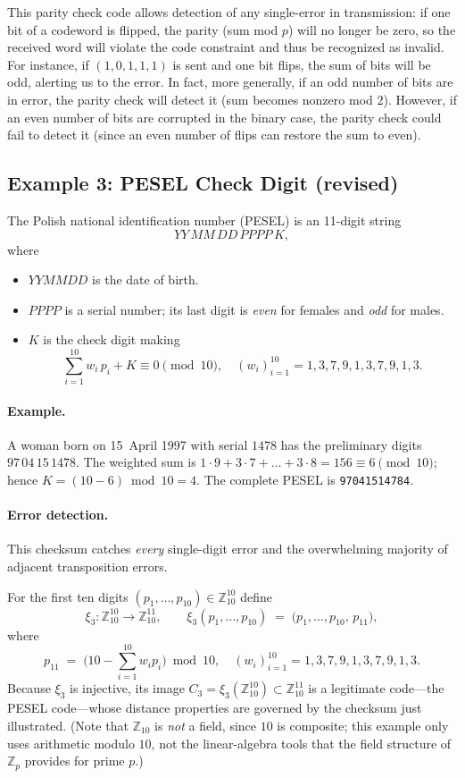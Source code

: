 \documentclass[docmute]{article}
\begin{document}
This parity check code allows detection of any single-error in transmission: if one bit of a codeword is flipped, the parity (sum mod $p$) will no longer be zero, so the received word will violate the code constraint and thus be recognized as invalid. For instance, if $(1,0,1,1,1)$ is sent and one bit flips, the sum of bits will be odd, alerting us to the error. In fact, more generally, if an odd number of bits are in error, the parity check will detect it (sum becomes nonzero mod 2). However, if an even number of bits are corrupted in the binary case, the parity check could fail to detect it (since an even number of flips can restore the sum to even).

\subsection*{Example 3: \textsc{PESEL} Check Digit (revised)}
The Polish national identification number (\textsc{PESEL}) is an
11-digit string
\[
  YY\,MM\,DD\,PPPP\,K,
\]
where
\begin{itemize}
  \item $YYMMDD$ is the date of birth.  
  \item $PPPP$ is a serial number; its last digit is \emph{even} for
        females and \emph{odd} for males.
  \item $K$ is the check digit making
        \[
          \sum_{i=1}^{10} w_i\,p_i + K \equiv 0 \pmod{10},
          \quad
          (w_i)_{i=1}^{10}=1,3,7,9,1,3,7,9,1,3.
        \]
\end{itemize}

\paragraph{Example.}
A woman born on 15~April 1997 with serial $1478$ has the preliminary
digits $97\,04\,15\,1478$.  The weighted sum is
$1\cdot9+3\cdot7+\dots+3\cdot8=156\equiv6\pmod{10}$; hence
$K=(10-6)\bmod10=4$.  The complete PESEL is \texttt{97041514784}.

\paragraph{Error detection.}
This checksum catches \emph{every} single-digit error and the
overwhelming majority of adjacent transposition errors.

For the first ten digits $(p_1,\dots,p_{10})\in\mathbb{Z}_{10}^{10}$
define
\[
  \xi_{3}:\mathbb{Z}_{10}^{10}\longrightarrow\mathbb{Z}_{10}^{11},
  \qquad
  \xi_{3}(p_1,\dots,p_{10})
  \;=\;
  \bigl(p_1,\dots,p_{10},\,p_{11}\bigr),
\]
where
\[
  p_{11}
  \;=\;
  \bigl(10-\!\!\!\sum_{i=1}^{10} w_i p_i\bigr)\bmod10,
  \quad
  (w_i)_{i=1}^{10}=1,3,7,9,1,3,7,9,1,3.
\]
Because $\xi_{3}$ is injective, its image
$C_3=\xi_{3}(\mathbb{Z}_{10}^{10})\subset\mathbb{Z}_{10}^{11}$
is a legitimate code—the \textsc{PESEL} code—whose distance properties
are governed by the checksum just illustrated.
(Note that $\mathbb{Z}_{10}$ is \emph{not} a field, since $10$ is composite;
this example only uses arithmetic modulo $10$, not the linear-algebra tools
that the field structure of $\mathbb{Z}_p$ provides for prime $p$.)
\end{document}
